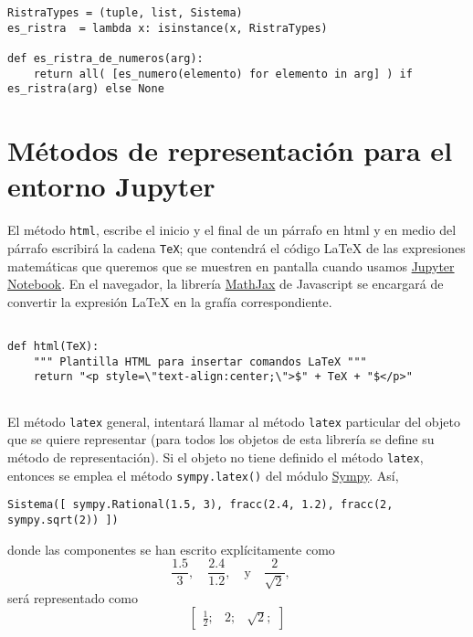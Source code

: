 \documentclass[11pt]{report}
\begin{document}
\begin{verbatim}
RistraTypes = (tuple, list, Sistema)
es_ristra  = lambda x: isinstance(x, RistraTypes) 

def es_ristra_de_numeros(arg):
    return all( [es_numero(elemento) for elemento in arg] ) if es_ristra(arg) else None

\end{verbatim}
\section{Métodos de representación para el entorno Jupyter}
\label{sec:orgb0e4579}

El método \texttt{html}, escribe el inicio y el final de un párrafo en html y
en medio del párrafo escribirá la cadena \texttt{TeX}; que contendrá el
código \LaTeX{} de las expresiones matemáticas que queremos que se
muestren en pantalla cuando usamos \href{https://jupyter.org/}{Jupyter Notebook}. En el navegador,
la librería \href{https://jupyter-notebook.readthedocs.io/en/stable/examples/Notebook/Typesetting\%20Equations.html}{MathJax} de Javascript se encargará de convertir la
expresión \LaTeX{} en la grafía correspondiente.

\begin{verbatim}

def html(TeX):
    """ Plantilla HTML para insertar comandos LaTeX """
    return "<p style=\"text-align:center;\">$" + TeX + "$</p>"
    
\end{verbatim}

El método \texttt{latex} general, intentará llamar al método \texttt{latex}
particular del objeto que se quiere representar (para todos los
objetos de esta librería se define su método de representación). Si el
objeto no tiene definido el método \texttt{latex}, entonces se emplea el
método \texttt{sympy.latex()} del módulo \href{https://www.sympy.org/en/index.html}{Sympy}. Así,
\begin{verbatim}
Sistema([ sympy.Rational(1.5, 3), fracc(2.4, 1.2), fracc(2, sympy.sqrt(2)) ]) 
\end{verbatim}
donde las componentes se han escrito explícitamente como 
\begin{displaymath}
\frac{1.5}{3},\quad
\frac{2.4}{1.2},\quad\text{y}\quad
\frac{2}{\sqrt{2}},\quad
\end{displaymath}
será representado como
$$\left[ \begin{array}{ccc}\frac{1}{2};& 2;& \sqrt{2};\end{array} \right]$$
\end{document}
